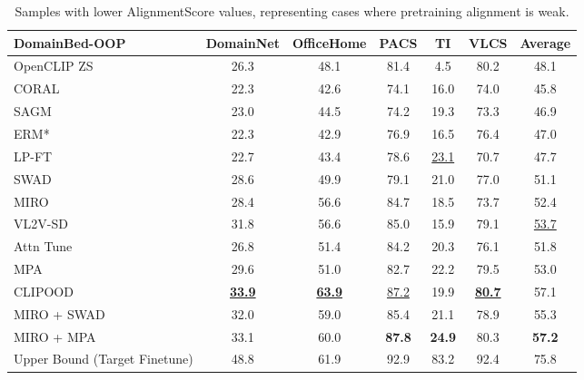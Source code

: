\documentclass{article} %
\begin{document}
\begin{table}[H]
\begin{subtable}[t]{1\textwidth}
\centering
\begin{tabular}{lcccccc}
\toprule
\textbf{DomainBed-OOP   } & DomainNet & OfficeHome & PACS & TI& VLCS      & Average \\ \midrule
OpenCLIP ZS & 26.3  & 48.1 & 81.4 & 4.5 & 80.2  & 48.1 \\ \midrule \color{black}
CORAL~\citep{sun2016deep} & 22.3 & 42.6 & 74.1 & 16.0 & 74.0 & 45.8 \\
SAGM~\citep{wang2023sharpness} & 23.0 & 44.5 & 74.2 & 19.3 & 73.3 & 46.9 \\ 
ERM*~\citep{gulrajani2020search} & 22.3 & 42.9 & 76.9 & 16.5 & 76.4 & 47.0 \\ 
LP-FT~\citep{kumar2021fine} & 22.7 & 43.4 & 78.6 & \underline{23.1} & 70.7 & 47.7 \\ 
SWAD~\citep{cha2021swad} & 28.6 & 49.9 & 79.1 & 21.0 & 77.0 & 51.1 \\ 
MIRO~\citep{cha2022miro} & 28.4 & 56.6 & 84.7 & 18.5 & 73.7 & 52.4 \\ 
VL2V-SD~\citep{addepalli2024leveraging} &31.8 & 56.6 & 85.0 & 15.9 & 79.1 & \underline{53.7} \\ 
Attn Tune~\citep{teterwak2023erm++} & 26.8 & 51.4 & 84.2 & 20.3 & 76.1 & 51.8 \\ 
MPA~\citep{arpit2022ensemble} & 29.6 & 51.0 & 82.7 & 22.2 & 79.5 & 53.0 \\  
CLIPOOD~\citep{shu2023clipood} & \textbf{\underline{33.9}}  & \textbf{\underline{63.9}} & \underline{87.2} &  19.9 &  \textbf{\underline{80.7}} & 57.1 \\
\midrule
MIRO + SWAD & 32.0 & 59.0 & 85.4 & 21.1 & 78.9 & 55.3 \\
MIRO + MPA & 33.1 & 60.0 & \textbf{87.8} & \textbf{24.9} & 80.3 & \textbf{57.2} \\ \midrule
Upper Bound (Target Finetune) & 48.8 & 61.9 & 92.9 & 83.2  & 92.4  & 75.8  \\ \bottomrule

\end{tabular}
\caption{Samples with lower AlignmentScore values, representing  cases where pretraining alignment is weak.}
\end{subtable}
\vspace{10pt}


\end{table}
\end{document}
